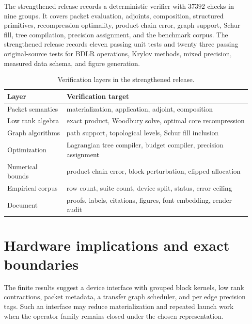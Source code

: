 The strengthened release records a deterministic verifier with $37392$ checks in nine groups. It covers packet evaluation, adjoints, composition, structured primitives, recompression optimality, product chain error, graph support, Schur fill, tree compilation, precision assignment, and the benchmark corpus. The strengthened release records eleven passing unit tests and twenty three passing original-source tests for BDLR operations, Krylov methods, mixed precision, measured data schema, and figure generation.

\begin{table}[t]
\centering
\small
\begin{tabular}{>{\raggedright\arraybackslash}p{}>{\raggedright\arraybackslash}p{}}
\toprule
Layer & Verification target \\
\midrule
Packet semantics & materialization, application, adjoint, composition \\
Low rank algebra & exact product, Woodbury solve, optimal core recompression \\
Graph algorithms & path support, topological levels, Schur fill inclusion \\
Optimization & Lagrangian tree compiler, budget compiler, precision assignment \\
Numerical bounds & product chain error, block perturbation, clipped allocation \\
Empirical corpus & row count, suite count, device split, status, error ceiling \\
Document & proofs, labels, citations, figures, font embedding, render audit \\
\bottomrule
\end{tabular}
\caption{Verification layers in the strengthened release.}
\label{tab:verification_layers}
\end{table}

\section{Hardware implications and exact boundaries}\label{main:section:014}\label{sec:boundaries}

The finite results suggest a device interface with grouped block kernels, low rank contractions, packet metadata, a transfer graph scheduler, and per edge precision tags. Such an interface may reduce materialization and repeated launch work when the operator family remains closed under the chosen representation.

